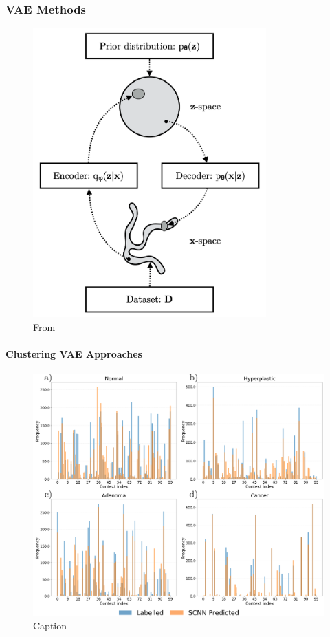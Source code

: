 \subsubsection{VAE Methods}

\begin{figure}[htbp]
  \centering
  \includegraphics[width=0.8\textwidth]{Images/VAE_overview.png}
  \caption{From \cite{kingma_introduction_nodate}}
  \label{fig:my-label}
\end{figure}

\paragraph{Clustering VAE Approaches}

\begin{figure}[htbp]
  \centering
  \includegraphics[width=1\textwidth]{Images/crime_groupings_by_category_100.png}
  \caption{Caption}
  \label{fig:my-label}
\end{figure}

